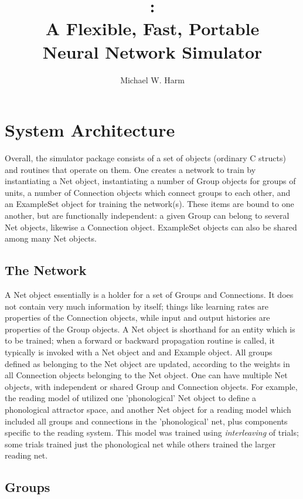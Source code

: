 \documentclass[jou]{apa}
\title{\mikenet:\\ 
A Flexible, Fast, Portable\\
Neural Network Simulator}
\author{Michael W. Harm}
\affiliation{University of Southern California\\
Computer Science Department\\
mharm@gizmo.usc.edu}
\begin{document}
\maketitle

\section{System Architecture}

Overall, the simulator package consists of a set of objects
(ordinary C structs) and routines that operate on them.  One
creates a network to train by instantiating a Net object,
instantiating a number of Group objects for groups of units,
a number of Connection objects which connect groups to each
other, and an ExampleSet object for training the network(s).
These items are bound to one another, but are functionally 
independent: a given Group can belong to several Net objects,
likewise a Connection object.  ExampleSet objects can also be
shared among many Net objects.  

\subsection{The Network}

A Net object essentially is a holder for a set of Groups and
Connections.  It does not contain very much information by itself;
things like learning rates are properties of the Connection objects,
while input and output histories are properties of the Group objects.
A Net object is shorthand for an entity which is to be trained; when a
forward or backward propagation routine is called, it typically is
invoked with a Net object and and Example object.  All groups defined
as belonging to the Net object are updated, according to the weights
in all Connection objects belonging to the Net object.  One can have
multiple Net objects, with independent or shared Group and Connection
objects. For example, the reading model of \cite{harm.seidenberg96}
utilized one 'phonological' Net object to define a phonological
attractor space, and another Net object for a reading model which
included all groups and connections in the 'phonological' net, plus
components specific to the reading system.  This model was trained
using {\em interleaving} of trials; some trials trained just the
phonological net while others trained the larger reading net.



\subsection{Groups}
\end{document}
